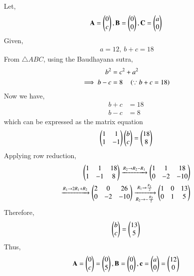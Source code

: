  Let,
\begin{align}
\Vec{A}=\myvec{0 \\ c},
\Vec{B}=\myvec{0 \\ 0},
\Vec{C}=\myvec{a \\ 0}
\end{align}
 Given,
\begin{align}
\ a= 12,
\ b+c = 18
\end{align}
 From  $\triangle ABC$, using  the Baudhayana sutra,
\begin{align}
 b^2 &=c^2+a^2
\\
\implies b-c &=8 \quad \left(\because b+c = 18\right)
\end{align}
 Now we have,
\begin{align}
b+c &=18
\\
b-c &=8
\end{align}
which can be expressed as the matrix equation
\begin{equation}
 \begin{pmatrix}1 & 1\\1 & -1 \end{pmatrix}\begin{pmatrix}b\\c\end{pmatrix} = \begin{pmatrix}18\\8\end{pmatrix}
\end{equation}
Applying row reduction, 
\begin{align}
\begin{pmatrix}
1 & 1   & 18 
\\
1 & -1   & 8 
\end{pmatrix}
  \xrightarrow{R_2\rightarrow R_2-R_1}
\begin{pmatrix}
1 & 1   & 18
\\
0 & -2   & -10 
\end{pmatrix} 
\\
  \xrightarrow{R_1\rightarrow 2R_1+R_2} 
\begin{pmatrix}
2 & 0   & 26 
\\
0 & -2   & -10 
\end{pmatrix}
 \xrightarrow[R_2 \rightarrow -\frac{R_2}{2}]{R_1\rightarrow \frac{R_1}{2}} 
\begin{pmatrix}
1 & 0   & 13 
\\
0 & 1   & 5 
\end{pmatrix}
\end{align}
Therefore,
\begin{align}
\begin{pmatrix}b\\c\end{pmatrix} = \begin{pmatrix}13\\5\end{pmatrix}
\end{align}
Thus, 
\begin{align}
\mathbf{A}=\begin{pmatrix}0\\c\end{pmatrix}=\begin{pmatrix}0\\5\end{pmatrix}, \mathbf{B}=\begin{pmatrix}0\\0\end{pmatrix}, \mathbf{c}=\begin{pmatrix}a\\0\end{pmatrix}=\begin{pmatrix}12\\0\end{pmatrix} 
\end{align}
